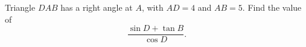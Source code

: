Triangle $DAB$ has a right angle at $A$, with $AD=4$ and $AB=5$. Find the value of
\[\dfrac{\sin D+\tan B}{\cos D}.\]
